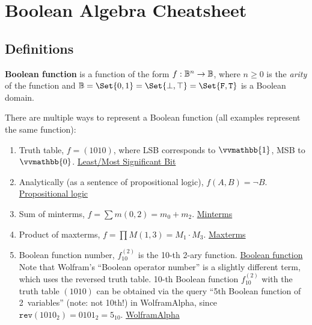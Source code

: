 \documentclass[a4paper,10pt]{article}
\begin{document}

\setcounter{section}{2}%
\section{Boolean Algebra Cheatsheet}

\subsection{Definitions}

\begin{terms}
    \item \raggedright \textbf{Boolean function} is a function of the form $f: \mathbb{B}^{n} \to \mathbb{B}$, where $n \geq 0$ is the \emph{arity} of the function and $\Bool =\nobreak \Set{0, 1} =\nobreak \Set{\bot, \top} =\nobreak \Set{\texttt{F}, \texttt{T}}$ is a Boolean domain.

    \item There are multiple ways to represent a Boolean function (all examples represent the same function):

    \begin{enumerate}[left=6pt .. 18pt]
        \item Truth table, \eg $f = (1010)$, where LSB corresponds to $\vvmathbb{1}$, MSB to $\vvmathbb{0}$.
        \hfill\href{https://en.wikipedia.org/wiki/Bit_numbering}{Least/Most Significant Bit}

        \item Analytically (as a sentence of propositional logic), \eg $f(A,B) = \neg B$.
        \hfill\href{https://en.wikipedia.org/wiki/Propositional_logic}{Propositional logic}

        \item Sum of minterms, \eg $f = \sum m(0,2) = m_0 + m_2$.
        \hfill\href{http://www.cs.ucr.edu/~ehwang/courses/cs120a/minterms.pdf}{Minterms}

        \item Product of maxterms, \eg $f = \prod M(1,3) = M_1 \cdot M_3$.
        \hfill\href{http://www.cs.ucr.edu/~ehwang/courses/cs120a/minterms.pdf#page=2}{Maxterms}

        \item Boolean function number, \eg $f^{(2)}_{10}$ is the 10-th 2-ary function.
        \hfill\href{https://mathworld.wolfram.com/BooleanFunction.html}{Boolean function} \\
        Note that Wolfram's \enquote{Boolean operator number} is a slightly different term, which uses the reversed truth table.
        10-th Boolean function $f^{(2)}_{10}$ with the truth table $(1010)$ can be obtained via the query \enquote{5th Boolean function of 2~variables} (note: not 10th!) in WolframAlpha, since $\texttt{rev}(1010_2) = 0101_2 = 5_{10}$.
        \hfill\href{https://bit.ly/3nFbad5}{WolframAlpha}

    \end{enumerate}

\end{terms}
\end{document}
